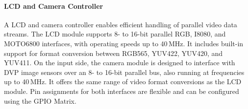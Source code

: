 \paragraph{LCD and Camera Controller}
A LCD and camera controller enables efficient handling of parallel video data streams. The LCD module supports 8- to 16-bit parallel RGB, I8080, and MOTO6800 interfaces, with operating speeds up to 40\,MHz. It includes built-in support for format conversion between RGB565, YUV422, YUV420, and YUV411. On the input side, the camera module is designed to interface with DVP image sensors over an 8- to 16-bit parallel bus, also running at frequencies up to 40\,MHz. It offers the same range of video format conversions as the LCD module. Pin assignments for both interfaces are flexible and can be configured using the GPIO Matrix.

